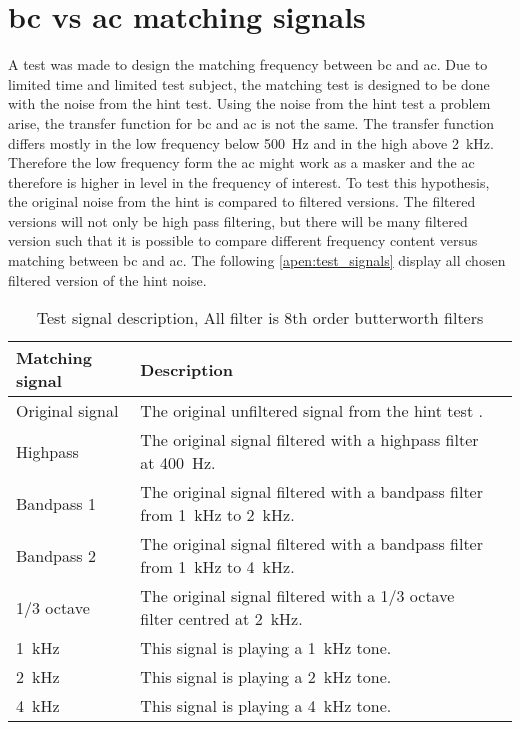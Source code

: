 \chapter*{\gls{bc} vs \gls{ac} matching signals}
\label{apend_matching_signals}
A test was made to design the matching frequency between \gls{bc} and \gls{ac}. Due to limited time and limited test subject, the matching test is designed to be done with the noise from the \gls{hint} test. Using the noise from the \gls{hint} test a problem arise, the transfer function for \gls{bc} and \gls{ac} is not the same. The transfer function differs mostly in the low frequency below \SI{500}{\hertz} and in the high above \SI{2}{\kilo\hertz}. Therefore the low frequency form the \gls{ac} might work as a masker and the \gls{ac} therefore is higher in level in the frequency of interest. To test this hypothesis, the original noise from the \gls{hint} is compared to filtered versions. The filtered versions will not only be high pass filtering, but there will be many filtered version such that it is possible to compare different frequency content versus matching between \gls{bc} and \gls{ac}. The following \autoref{apen:test_signals} display all chosen filtered version of the \gls{hint} noise. 


\begin{table}[H]
\caption{Test signal description, All filter is 8th order butterworth filters}
\begin{tabularx}{\textwidth}{l | X l}
Matching signal       & Description \\ \hline
Original signal         & The original unfiltered signal from the \gls{hint} test \citep{hint_2011}.      \\
Highpass        & The original signal filtered with a highpass filter at \SI{400}{\hertz}.           \\
Bandpass 1        & The original signal filtered with a bandpass filter from \SI{1}{\kilo\hertz} to \SI{2}{\kilo\hertz}.           \\
Bandpass 2        & The original signal filtered with a bandpass filter from \SI{1}{\kilo\hertz} to \SI{4}{\kilo\hertz}.          \\
1/3 octave & The original signal filtered with a 1/3 octave filter centred at \SI{2}{\kilo\hertz}.          \\
\SI{1}{\kilo\hertz}                  & This signal is playing a \SI{1}{\kilo\hertz} tone.      \\
\SI{2}{\kilo\hertz}                 & This signal is playing a \SI{2}{\kilo\hertz} tone.          \\
\SI{4}{\kilo\hertz}                 & This signal is playing a \SI{4}{\kilo\hertz} tone.        
\end{tabularx}
\label{apen:test_signals}
\end{table}

